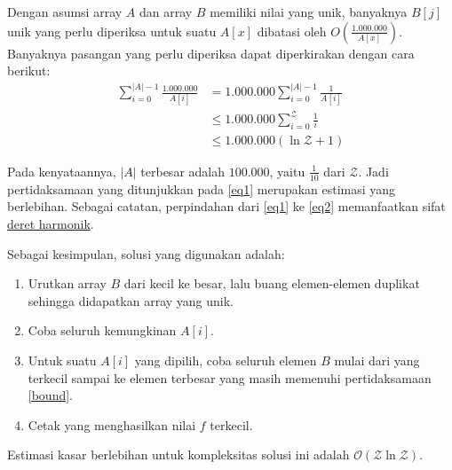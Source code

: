 \documentclass[../main_editorial.tex]{subfiles} %
\newcommand{\bigO}[1]{\mathcal{O}(#1)}
\newcommand{\maxValue}{\mathcal{Z}}
\begin{document}
Dengan asumsi array $A$ dan array $B$ memiliki nilai yang unik, banyaknya $B[j]$ unik yang perlu diperiksa untuk suatu $A[x]$ dibatasi oleh $O\left(\frac{1.000.000}{A[x]}\right)$. Banyaknya pasangan yang perlu diperiksa dapat diperkirakan dengan cara berikut:
\begin{align}
\sum_{i=0}^{|A|-1} \frac{1.000.000}{A[i]} &= 1.000.000 \sum_{i=0}^{|A|-1} \frac{1}{A[i]} \nonumber \\
&\le 1.000.000 \sum_{i=0}^{\maxValue} \frac{1}{i} \label{eq1} \\
&\le 1.000.000 (\ln{\maxValue} + 1) \label{eq2}
\end{align}

Pada kenyataannya, $|A|$ terbesar adalah $100.000$, yaitu $\frac{1}{10}$ dari $\maxValue$. Jadi pertidaksamaan yang ditunjukkan pada \ref{eq1} merupakan estimasi yang berlebihan. Sebagai catatan, perpindahan dari \ref{eq1} ke \ref{eq2} memanfaatkan sifat \href{https://en.wikipedia.org/wiki/Harmonic_series_%28mathematics%29}{deret harmonik}.

Sebagai kesimpulan, solusi yang digunakan adalah:
\begin{enumerate}
\item Urutkan array $B$ dari kecil ke besar, lalu buang elemen-elemen duplikat sehingga didapatkan array yang unik.
\item Coba seluruh kemungkinan $A[i]$.
\item Untuk suatu $A[i]$ yang dipilih, coba seluruh elemen $B$ mulai dari yang terkecil sampai ke elemen terbesar yang masih memenuhi pertidaksamaan \ref{bound}.
\item Cetak yang menghasilkan nilai $f$ terkecil.
\end{enumerate}

Estimasi kasar berlebihan untuk kompleksitas solusi ini adalah $\bigO{\maxValue \ln{\maxValue}}$.
\end{document}
